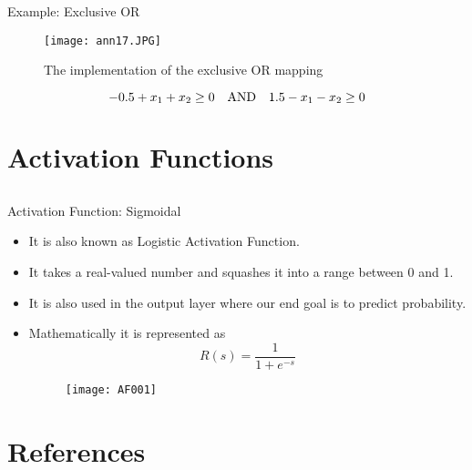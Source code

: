 \begin{frame}{Example: Exclusive OR }
\begin{figure}
\texttt{[image: ann17.JPG]}
\caption{The implementation of the exclusive OR mapping}
\end{figure}
\begin{equation}
-0.5+x_1+x_2\geq 0~~~{\rm AND}~~~1.5-x_1-x_2\geq0\nonumber
\end{equation}
\end{frame}

\section{Activation Functions}
\subsection{}
\begin{frame}{Activation Function: Sigmoidal}
\begin{itemize}
\item It is also known as Logistic Activation Function.
\item It takes a real-valued number and squashes it into a range between 0 and 1. 
\item It is also used in the output layer where our end goal is to predict probability. 
\item Mathematically it is represented as
\begin{equation}
R(s) = \frac{1}{{1 + {e^{ - s}}}} \nonumber
\end{equation}
\begin{figure}[h]
\centering
\texttt{[image: AF001]}
\end{figure}
\end{itemize}
\end{frame}


\section{References}
